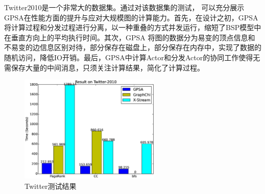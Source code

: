 Twitter2010是一个非常大的数据集。通过对该数据集的测试，
可以充分展示GPSA在性能方面的提升与应对大规模图的计算能力。首先，在设计之初，GPSA将计算过程和分发过程进行分离，以一种重叠的方式并发运行，缩短了BSP模型中在垂直方向上的平均执行时间。其次，GPSA 将图的数据分为易变的顶点信息和不易变的边信息区别对待，部分保存在磁盘上，部分保存在内存中，实现了数据的随机访问，降低IO开销。最后，GPSA中计算Actor和分发Actor的协同工作使得无需保存大量的中间消息，只须关注计算结果，简化了计算过程。

\begin{figure}[htbp]
\centering
\includegraphics[width=0.6\textwidth,scale=0.8]{myfigures/twittertime2.eps}
\caption{Twitter测试结果}
\label{res:twitter}
\end{figure}


